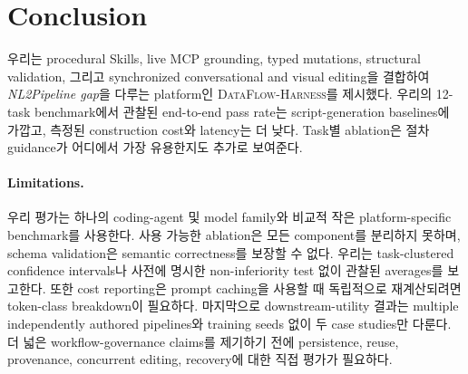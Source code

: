 \FloatBarrier

\section{Conclusion}
우리는 procedural Skills, live MCP grounding, typed mutations, structural validation, 그리고 synchronized conversational and visual editing을 결합하여 \textit{NL2Pipeline gap}을 다루는 platform인 \textsc{DataFlow-Harness}를 제시했다. 우리의 12-task benchmark에서 관찰된 end-to-end pass rate는 script-generation baselines에 가깝고, 측정된 construction cost와 latency는 더 낮다. Task별 ablation은 절차 guidance가 어디에서 가장 유용한지도 추가로 보여준다.

\paragraph{Limitations.}
우리 평가는 하나의 coding-agent 및 model family와 비교적 작은 platform-specific benchmark를 사용한다. 사용 가능한 ablation은 모든 component를 분리하지 못하며, schema validation은 semantic correctness를 보장할 수 없다. 우리는 task-clustered confidence intervals나 사전에 명시한 non-inferiority test 없이 관찰된 averages를 보고한다. 또한 cost reporting은 prompt caching을 사용할 때 독립적으로 재계산되려면 token-class breakdown이 필요하다. 마지막으로 downstream-utility 결과는 multiple independently authored pipelines와 training seeds 없이 두 case studies만 다룬다. 더 넓은 workflow-governance claims를 제기하기 전에 persistence, reuse, provenance, concurrent editing, recovery에 대한 직접 평가가 필요하다.
